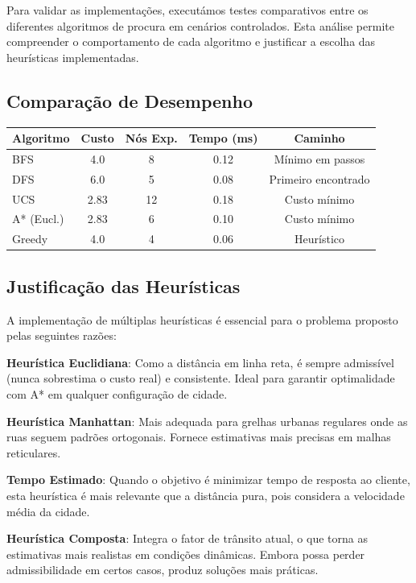 \documentclass[11pt,a4paper]{article}
\begin{document}
Para validar as implementações, executámos testes comparativos entre os diferentes algoritmos de procura em cenários controlados. Esta análise permite compreender o comportamento de cada algoritmo e justificar a escolha das heurísticas implementadas.

\subsection{Comparação de Desempenho}

\begin{center}
\begin{tabular}{|l|c|c|c|c|}
\hline
\textbf{Algoritmo} & \textbf{Custo} & \textbf{Nós Exp.} & \textbf{Tempo (ms)} & \textbf{Caminho} \\
\hline
BFS & 4.0 & 8 & 0.12 & Mínimo em passos \\
DFS & 6.0 & 5 & 0.08 & Primeiro encontrado \\
UCS & 2.83 & 12 & 0.18 & Custo mínimo \\
A* (Eucl.) & 2.83 & 6 & 0.10 & Custo mínimo \\
Greedy & 4.0 & 4 & 0.06 & Heurístico \\
\hline
\end{tabular}
\end{center}

\subsection{Justificação das Heurísticas}

A implementação de múltiplas heurísticas é essencial para o problema proposto pelas seguintes razões:

\textbf{Heurística Euclidiana}: Como a distância em linha reta, é sempre admissível (nunca sobrestima o custo real) e consistente. Ideal para garantir optimalidade com A* em qualquer configuração de cidade.

\textbf{Heurística Manhattan}: Mais adequada para grelhas urbanas regulares onde as ruas seguem padrões ortogonais. Fornece estimativas mais precisas em malhas reticulares.

\textbf{Tempo Estimado}: Quando o objetivo é minimizar tempo de resposta ao cliente, esta heurística é mais relevante que a distância pura, pois considera a velocidade média da cidade.

\textbf{Heurística Composta}: Integra o fator de trânsito atual, o que torna as estimativas mais realistas em condições dinâmicas. Embora possa perder admissibilidade em certos casos, produz soluções mais práticas.
\end{document}
